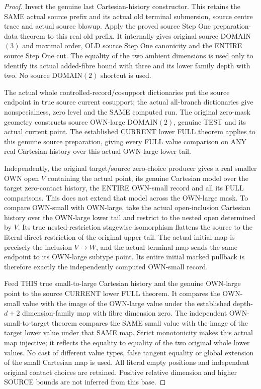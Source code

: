 \begin{proof}
Invert the genuine last Cartesian-history constructor. This retains
the SAME actual source prefix and its actual old terminal submersion,
source centre trace and actual source blowup. Apply the proved source
Step One preparation-data theorem to this real old prefix. It internally
gives original source DOMAIN$(3)$ and maximal order, OLD source Step
One canonicity and the ENTIRE source Step One cut. The equality of the
two ambient dimensions is used only to identify its actual added-fibre
bound with three and its lower family depth with two. No source
DOMAIN$(2)$ shortcut is used.

The actual whole controlled-record/cosupport dictionaries put the
source endpoint in true source current cosupport; the actual
all-branch dictionaries give nonspecialness, zero level and the SAME
computed run. The original zero-mask geometry constructs source
OWN-large DOMAIN$(2)$, genuine TEST and its actual current point.
The established CURRENT lower FULL theorem applies to this genuine
source preparation, giving every FULL value comparison on ANY real
Cartesian history over this actual OWN-large lower tail.

Independently, the original target/source zero-choice producer gives a
real smaller OWN open $V$ containing the actual point, its genuine
Cartesian model over the target zero-contact history, the ENTIRE
OWN-small record and all its FULL comparisons. This does not extend
that model across the OWN-large mask. To compare OWN-small with
OWN-large, take the actual open-inclusion Cartesian history over the
OWN-large lower tail and restrict to the nested open determined by
$V$. Its true nested-restriction stagewise isomorphism flattens the
source to the literal direct restriction of the original upper tail.
The actual initial map is precisely the inclusion $V\to W$, and the
actual terminal map sends the same endpoint to its OWN-large subtype
point. Its entire initial marked pullback is therefore exactly the
independently computed OWN-small record.

Feed THIS true small-to-large Cartesian history and the genuine
OWN-large point to the source CURRENT lower FULL theorem. It compares
the OWN-small value with the image of the OWN-large value under the
established depth-$d+2$ dimension-family map with fibre dimension zero.
The independent OWN-small-to-target theorem compares the SAME small
value with the image of the target lower value under that SAME map.
Strict monotonicity makes this actual map injective; it reflects the
equality to equality of the two original whole lower values. No cast
of different value types, false tangent equality or global extension
of the small Cartesian map is used. All literal empty positions and
independent original contact choices are retained. Positive relative
dimension and higher SOURCE bounds are not inferred from this base.
\end{proof}
